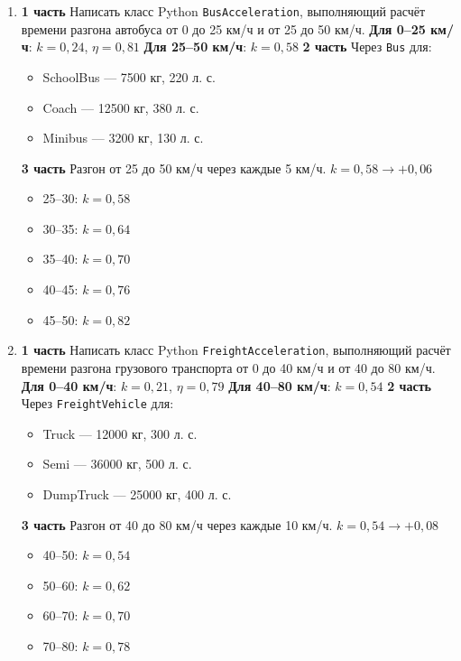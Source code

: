 \begin{enumerate}
    \item[15] \textbf{1 часть}  
    Написать класс Python \texttt{BusAcceleration}, выполняющий расчёт времени разгона автобуса от 0 до 25 км/ч и от 25 до 50 км/ч.  
    \textbf{Для 0–25 км/ч}: $k = 0{,}24$, $\eta = 0{,}81$  
    \textbf{Для 25–50 км/ч}: $k = 0{,}58$  
    \textbf{2 часть}  
    Через \texttt{Bus} для:  
    \begin{itemize}
        \item SchoolBus — 7500 кг, 220 л. с.  
        \item Coach — 12500 кг, 380 л. с.  
        \item Minibus — 3200 кг, 130 л. с.  
    \end{itemize}
    \textbf{3 часть}  
    Разгон от 25 до 50 км/ч через каждые 5 км/ч. $k = 0{,}58 \to +0{,}06$  
    \begin{itemize}
        \item 25–30: $k = 0{,}58$  
        \item 30–35: $k = 0{,}64$  
        \item 35–40: $k = 0{,}70$  
        \item 40–45: $k = 0{,}76$  
        \item 45–50: $k = 0{,}82$  
    \end{itemize}

    \item[16] \textbf{1 часть}  
    Написать класс Python \texttt{FreightAcceleration}, выполняющий расчёт времени разгона грузового транспорта от 0 до 40 км/ч и от 40 до 80 км/ч.  
    \textbf{Для 0–40 км/ч}: $k = 0{,}21$, $\eta = 0{,}79$  
    \textbf{Для 40–80 км/ч}: $k = 0{,}54$  
    \textbf{2 часть}  
    Через \texttt{FreightVehicle} для:  
    \begin{itemize}
        \item Truck — 12000 кг, 300 л. с.  
        \item Semi — 36000 кг, 500 л. с.  
        \item DumpTruck — 25000 кг, 400 л. с.  
    \end{itemize}
    \textbf{3 часть}  
    Разгон от 40 до 80 км/ч через каждые 10 км/ч. $k = 0{,}54 \to +0{,}08$  
    \begin{itemize}
        \item 40–50: $k = 0{,}54$  
        \item 50–60: $k = 0{,}62$  
        \item 60–70: $k = 0{,}70$  
        \item 70–80: $k = 0{,}78$  
    \end{itemize}


\end{enumerate}
